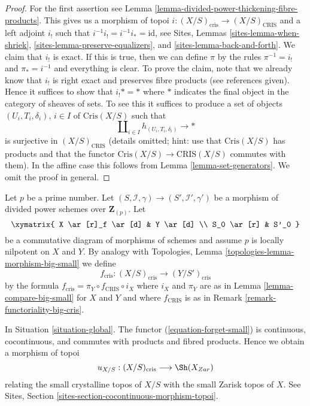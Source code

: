 \begin{proof}
For the first assertion see
Lemma \ref{lemma-divided-power-thickening-fibre-products}.
This gives us a morphism of topoi
$i : (X/S)_{\text{cris}} \to (X/S)_{\text{CRIS}}$ and a left adjoint
$i_!$ such that $i^{-1}i_! = i^{-1}i_* = \text{id}$, see
Sites, Lemmas \ref{sites-lemma-when-shriek},
\ref{sites-lemma-preserve-equalizers}, and
\ref{sites-lemma-back-and-forth}.
We claim that $i_!$ is exact. If this is true, then we can define
$\pi$ by the rules $\pi^{-1} = i_!$ and $\pi_* = i^{-1}$
and everything is clear. To prove the claim, note that we already know
that $i_!$ is right exact and preserves fibre products (see references
given). Hence it suffices to show that $i_! * = *$ where $*$ indicates
the final object in the category of sheaves of sets. 
To see this it suffices to produce a set of objects
$(U_i, T_i, \delta_i)$, $i \in I$ of $\text{Cris}(X/S)$ such that
$$
\coprod\nolimits_{i \in I} h_{(U_i, T_i, \delta_i)} \to *
$$
is surjective in $(X/S)_{\text{CRIS}}$ (details omitted; hint: use that
$\text{Cris}(X/S)$ has products and that the functor
$\text{Cris}(X/S) \to \text{CRIS}(X/S)$ commutes with them).
In the affine case this
follows from Lemma \ref{lemma-set-generators}. We omit the proof
in general.
\end{proof}

\begin{remark}[Functoriality]
\label{remark-functoriality-cris}
Let $p$ be a prime number.
Let $(S, \mathcal{I}, \gamma) \to (S', \mathcal{I}', \gamma')$
be a morphism of divided power schemes over $\mathbf{Z}_{(p)}$.
Let
$$
\xymatrix{
X \ar[r]_f \ar[d] & Y \ar[d] \\
S_0 \ar[r] & S'_0
}
$$
be a commutative diagram of morphisms of schemes and assume $p$ is
locally nilpotent on $X$ and $Y$. By analogy with
Topologies, Lemma \ref{topologies-lemma-morphism-big-small} we define
$$
f_{\text{cris}} : (X/S)_{\text{cris}} \longrightarrow (Y/S')_{\text{cris}}
$$
by the formula $f_{\text{cris}} = \pi_Y \circ f_{\text{CRIS}} \circ i_X$
where $i_X$ and $\pi_Y$ are as in Lemma \ref{lemma-compare-big-small}
for $X$ and $Y$ and where $f_{\text{CRIS}}$ is as in
Remark \ref{remark-functoriality-big-cris}.
\end{remark}

\begin{remark}
\label{remark-compare-zariski}
In Situation \ref{situation-global}.
The functor (\ref{equation-forget-small}) is continuous, cocontinuous, and
commutes with products and fibred products.
Hence we obtain a morphism of topoi
$$
u_{X/S} : (X/S)_{\text{cris}} \longrightarrow \Sh(X_{Zar})
$$
relating the small crystalline topos of $X/S$ with
the small Zarisk topos of $X$.
See Sites, Section \ref{sites-section-cocontinuous-morphism-topoi}.
\end{remark}

